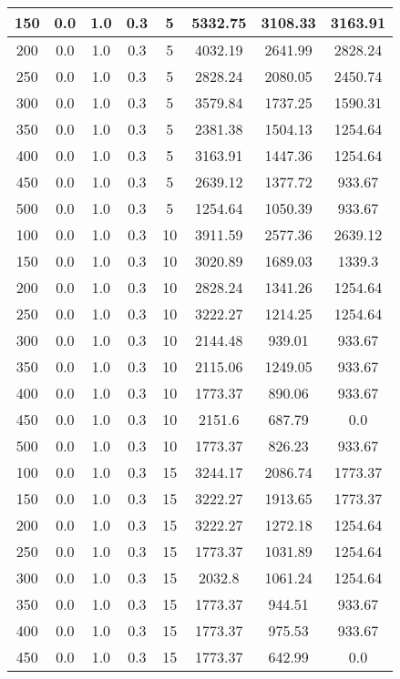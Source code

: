 \documentclass[a4paper, 12pt]{extreport}
\begin{document}
\begin{itemize}
\begin{longtable}{|c|c|c|c|c|c|c|c|}
			150 & 0.0 & 1.0 & 0.3 & 5 & 5332.75 & 3108.33 & 3163.91 \\\hline
			200 & 0.0 & 1.0 & 0.3 & 5 & 4032.19 & 2641.99 & 2828.24 \\\hline
			250 & 0.0 & 1.0 & 0.3 & 5 & 2828.24 & 2080.05 & 2450.74 \\\hline
			300 & 0.0 & 1.0 & 0.3 & 5 & 3579.84 & 1737.25 & 1590.31 \\\hline
			350 & 0.0 & 1.0 & 0.3 & 5 & 2381.38 & 1504.13 & 1254.64 \\\hline
			400 & 0.0 & 1.0 & 0.3 & 5 & 3163.91 & 1447.36 & 1254.64 \\\hline
			450 & 0.0 & 1.0 & 0.3 & 5 & 2639.12 & 1377.72 & 933.67 \\\hline
			500 & 0.0 & 1.0 & 0.3 & 5 & 1254.64 & 1050.39 & 933.67 \\\hline
			100 & 0.0 & 1.0 & 0.3 & 10 & 3911.59 & 2577.36 & 2639.12 \\\hline
			150 & 0.0 & 1.0 & 0.3 & 10 & 3020.89 & 1689.03 & 1339.3 \\\hline
			200 & 0.0 & 1.0 & 0.3 & 10 & 2828.24 & 1341.26 & 1254.64 \\\hline
			250 & 0.0 & 1.0 & 0.3 & 10 & 3222.27 & 1214.25 & 1254.64 \\\hline
			300 & 0.0 & 1.0 & 0.3 & 10 & 2144.48 & 939.01 & 933.67 \\\hline
			350 & 0.0 & 1.0 & 0.3 & 10 & 2115.06 & 1249.05 & 933.67 \\\hline
			400 & 0.0 & 1.0 & 0.3 & 10 & 1773.37 & 890.06 & 933.67 \\\hline
			450 & 0.0 & 1.0 & 0.3 & 10 & 2151.6 & 687.79 & 0.0 \\\hline
			500 & 0.0 & 1.0 & 0.3 & 10 & 1773.37 & 826.23 & 933.67 \\\hline
			100 & 0.0 & 1.0 & 0.3 & 15 & 3244.17 & 2086.74 & 1773.37 \\\hline
			150 & 0.0 & 1.0 & 0.3 & 15 & 3222.27 & 1913.65 & 1773.37 \\\hline
			200 & 0.0 & 1.0 & 0.3 & 15 & 3222.27 & 1272.18 & 1254.64 \\\hline
			250 & 0.0 & 1.0 & 0.3 & 15 & 1773.37 & 1031.89 & 1254.64 \\\hline
			300 & 0.0 & 1.0 & 0.3 & 15 & 2032.8 & 1061.24 & 1254.64 \\\hline
			350 & 0.0 & 1.0 & 0.3 & 15 & 1773.37 & 944.51 & 933.67 \\\hline
			400 & 0.0 & 1.0 & 0.3 & 15 & 1773.37 & 975.53 & 933.67 \\\hline
			450 & 0.0 & 1.0 & 0.3 & 15 & 1773.37 & 642.99 & 0.0 \\\hline

\end{longtable}
\end{itemize}
\end{document}
